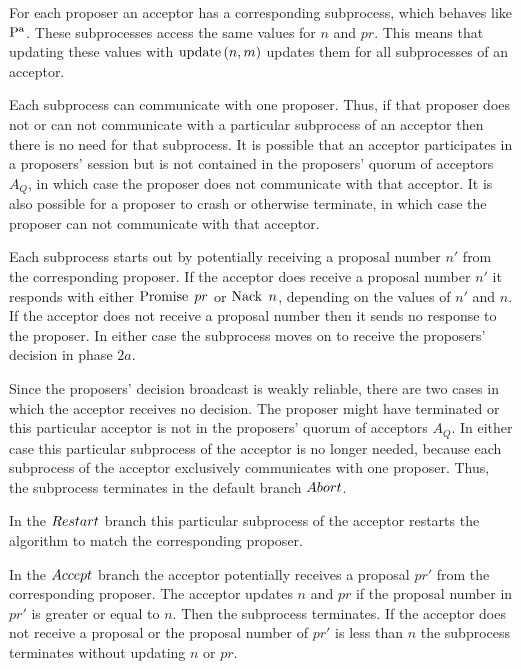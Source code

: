 For each proposer an acceptor has a corresponding subprocess, which behaves like $\operatorname{P^a}$.
These subprocesses access the same values for $n$ and $pr$.
This means that updating these values with $\operatorname{update} \left(n, m\right)$ updates them for all subprocesses of an acceptor.

Each subprocess can communicate with one proposer.
Thus, if that proposer does not or can not communicate with a particular subprocess of an acceptor then there is no need for that subprocess.
It is possible that an acceptor participates in a proposers' session but is not contained in the proposers' quorum of acceptors $A_Q$, in which case the proposer does not communicate with that acceptor.
It is also possible for a proposer to crash or otherwise terminate, in which case the proposer can not communicate with that acceptor.

Each subprocess starts out by potentially receiving a proposal number $n'$ from the corresponding proposer.
If the acceptor does receive a proposal number $n'$ it responds with either $\operatorname{Promise}\; pr$ or $\operatorname{Nack}\; n$, depending on the values of $n'$ and $n$.
If the acceptor does not receive a proposal number then it sends no response to the proposer.
In either case the subprocess moves on to receive the proposers' decision in phase $2a$.

Since the proposers' decision broadcast is weakly reliable, there are two cases in which the acceptor receives no decision.
The proposer might have terminated or this particular acceptor is not in the proposers' quorum of acceptors $A_Q$.
In either case this particular subprocess of the acceptor is no longer needed, because each subprocess of the acceptor exclusively communicates with one proposer.
Thus, the subprocess terminates in the default branch $\mathnormal{Abort}$.

In the $\mathnormal{Restart}$ branch this particular subprocess of the acceptor restarts the algorithm to match the corresponding proposer.

In the $\mathnormal{Accept}$ branch the acceptor potentially receives a proposal $pr'$ from the corresponding proposer.
The acceptor updates $n$ and $pr$ if the proposal number in $pr'$ is greater or equal to $n$.
Then the subprocess terminates.
If the acceptor does not receive a proposal or the proposal number of $pr'$ is less than $n$ the subprocess terminates without updating $n$ or $pr$.

